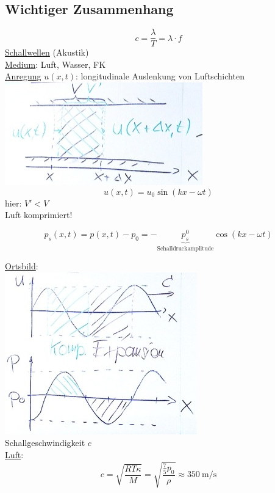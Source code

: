 \subsection{Wichtiger Zusammenhang}
\[ c = \frac{\lambda}{T} = \lambda \cdot f \]
\uline{Schallwellen} (Akustik) \\
\uline{Medium}: Luft, Wasser, FK \\
\uline{Anregung} $u( x , t )$: longitudinale Auslenkung von Luftschichten \\
\includegraphics{Bild230}
\[ u( x , t ) = u_0 \sin( kx - \omega t ) \]
hier: $V' < V$ \\
Luft komprimiert!
\begin{def*}[ note = Schalldruck , index = Schalldruck ]
	\[ p_s( x , t ) = p( x , t ) - p_0 = - \underbrace{p_s^0}_{\text{Schalldruckamplitude}} \cos( kx - \omega t ) \]
\end{def*}

\uline{Ortsbild}: \\
\includegraphics{Bild231} \\
Schallgeschwindigkeit $c$ \\
\uline{Luft}:
\[ c = \sqrt{\frac{RT \kappa}{M}} = \sqrt{\frac{\frac{7}{5} p_0}{\rho}} \approx \SI{350}{\metre\per\second} \]

